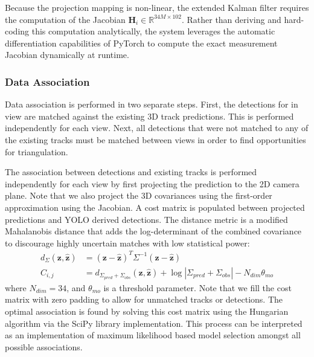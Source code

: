 Because the projection mapping is non-linear, the extended Kalman filter requires the computation of the Jacobian $\mathbf{H}_i \in \mathbb{R}^{34M \times 102}$. Rather than deriving and hard-coding this computation analytically, the system leverages the automatic differentiation capabilities of PyTorch \parencite{paszke2019pytorch,ansel2024pytorch} to compute the exact measurement Jacobian dynamically at runtime.


\subsubsection{Data Association} \label{arch-assoc}

Data association is performed in two separate steps. First, the detections for in view are matched against the existing 3D track predictions. This is performed independently for each view. Next, all detections that were not matched to any of the existing tracks must be matched between views in order to find opportunities for triangulation.

The association between detections and existing tracks is performed independently for each view by first projecting the prediction to the 2D camera plane. Note that we also project the 3D covariances using the first-order approximation using the Jacobian. A cost matrix is populated between projected predictions and YOLO derived detections. The distance metric is a modified Mahalanobis distance that adds the log-determinant of the combined covariance to discourage highly uncertain matches with low statistical power:
\begin{align*}
    d_\Sigma(\mathbf{z}, \hat{\mathbf{z}}) &= (\mathbf{z} - \hat{\mathbf{z}})^T \Sigma^{-1} (\mathbf{z} - \hat{\mathbf{z}}) \\
    C_{i,j} &= d_{\Sigma_{pred} + \Sigma_{obs}}(\mathbf{z}, \hat{\mathbf{z}}) + \log|\Sigma_{pred} + \Sigma_{obs}|  - N_{dim} \theta_{mo}
\end{align*}
where $N_{dim} = 34$, and $\theta_{mo}$ is a threshold parameter. Note that we fill the cost matrix with zero padding to allow for unmatched tracks or detections. The optimal association is found by solving this cost matrix using the Hungarian algorithm  \parencite{kuhn1955hungarian} via the SciPy library \parencite{virtanen2020scipy} implementation. This process can be interpreted as an implementation of maximum likelihood based model selection amongst all possible associations.

